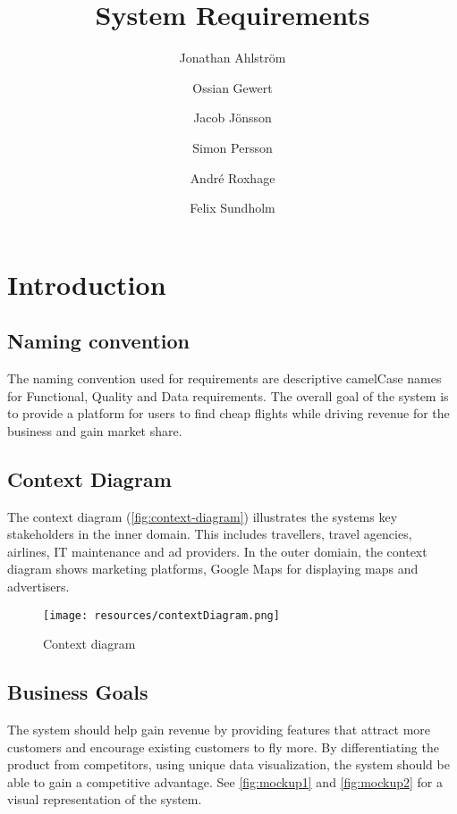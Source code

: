 \documentclass[a4paper]{article}
\title{System Requirements}
\author{Jonathan Ahlström \and Ossian Gewert \and Jacob Jönsson \and Simon Persson \and André Roxhage \and Felix Sundholm}
\begin{document}
\maketitle

\begin{center}
    
\end{center}

\newpage
\tableofcontents
\newpage

\section{Introduction}
\subsection{Naming convention}
The naming convention used for requirements are descriptive camelCase names for Functional, Quality and Data requirements.
The overall goal of the system is to provide a platform for users to find cheap flights while driving revenue for the business and gain market share.

\subsection{Context Diagram}
The context diagram (\autoref{fig:context-diagram}) illustrates the systems key stakeholders in the inner domain. This includes travellers, travel agencies, airlines, IT maintenance and ad providers. In the outer domiain, the context diagram shows marketing platforms, Google Maps for displaying maps and advertisers.
\begin{figure}[H]
    \texttt{[image: resources/contextDiagram.png]}
    \caption{Context diagram}
    \label{fig:context-diagram}
\end{figure}

\subsection{Business Goals}
The system should help gain revenue by providing features that attract more customers and encourage existing customers to fly more. By differentiating the product from competitors, using unique data visualization, the system should be able to gain a competitive advantage.
See \autoref{fig:mockup1} and \autoref{fig:mockup2} for a visual representation of the system.
\end{document}

